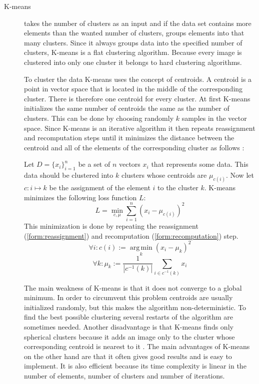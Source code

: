 \documentclass[journal]{vgtc}       %
\begin{document}
\begin{description}
\item [K-means] takes the number of clusters as an input and if the data set contains more elements than the wanted number of clusters, groups elements into that many clusters. Since it always groups data into the specified number of clusters, K-means is a flat clustering algorithm. Because every image is clustered into only one cluster it belongs to hard clustering algorithms. 

To cluster the data K-means uses the concept of centroids. A centroid is a point in vector space that is located in the middle of the corresponding cluster. There is therefore one centroid for every cluster. 
At first K-means initializes the same number of centroids the same as the number of clusters. This can be done by choosing randomly $k$ samples  in the vector space. Since K-means is an iterative algorithm  it then repeats reassignment and recomputation steps until it minimizes the distance between the centroid and all of the elements of the corresponding cluster as follows \cite{KI17}: 

Let $D = \{x_i\}_{i=1}^n$ be a set of $n$ vectors $x_i$ that represents some data. This data should be clustered into $k$ clusters whose centroids are  $\mu_{c(i)}$. Now let $c: i \mapsto k$ be the assignment of the element $i$ to the cluster $k$. 
K-means minimizes the following loss function $L$:
\begin{equation}
\label{form: loss}
L = \min_{c, \mu} \sum_{i=1}^{n}(x_i - \mu_{c(i)})^2
\end{equation} 
This minimization is done by repeating the reassignment (\ref{form:reassignment}) and recomputation (\ref{form:recomputation}) step.
\begin{equation}
\label{form:reassignment}
\forall i: c(i) := \operatorname*{arg\,min}_k (x_i - \mu_k)^2
\end{equation}
\begin{equation}
\label{form:recomputation}
\forall k: \mu_k := \frac{1}{|c^{-1}(k)|} \sum_{i \in c^{-1}(k)} x_i
\end{equation}


The main weakness of K-means is that it does not converge to a global minimum. In order to circumvent this problem centroids are usually initialized randomly, but this makes  the algorithm non-deterministic. To find the best possible clustering  several restarts of the algorithm are  sometimes needed.  Another disadvantage is that K-means finds only spherical clusters because it adds an image only to the cluster whose corresponding  centroid is nearest to it \cite{jain2010data}. The main advantages of K-means  on the other hand are that it often gives good results and is easy to implement. It is also efficient because its time complexity is linear in the number of elements, number of clusters and number of iterations. 


\end{description}
\end{document}
